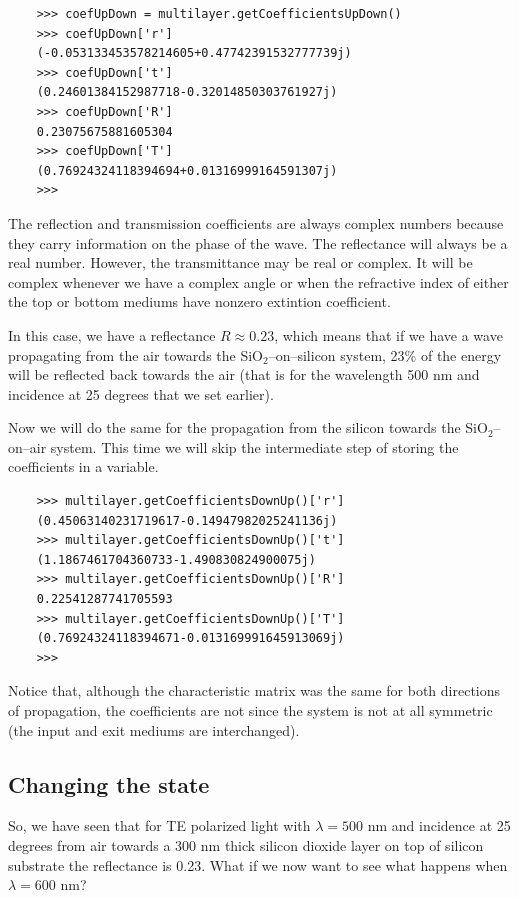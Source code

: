\documentclass[a4paper,11pt,aps,final]{revtex4}
\begin{document}
\begin{verbatim}
    >>> coefUpDown = multilayer.getCoefficientsUpDown()
    >>> coefUpDown['r']
    (-0.053133453578214605+0.47742391532777739j)
    >>> coefUpDown['t']
    (0.24601384152987718-0.32014850303761927j)
    >>> coefUpDown['R']
    0.23075675881605304
    >>> coefUpDown['T']
    (0.76924324118394694+0.01316999164591307j)
    >>>
\end{verbatim}

The reflection and transmission coefficients are always complex numbers because they carry information on the phase of the wave. The reflectance will always be a real number. However, the transmittance may be real or complex. It will be complex whenever we have a complex angle or when the refractive index of either the top or bottom mediums have nonzero extintion coefficient.

In this case, we have a reflectance $R \approx 0.23$, which means that if we have a wave propagating from the air towards the SiO$_2$--on--silicon system, 23\% of the energy will be reflected back towards the air (that is for the wavelength 500 nm and incidence at 25 degrees that we set earlier).

Now we will do the same for the propagation from the silicon towards the SiO$_2$--on--air system. This time we will skip the intermediate step of storing the coefficients in a variable.

\begin{verbatim}
    >>> multilayer.getCoefficientsDownUp()['r']
    (0.45063140231719617-0.14947982025241136j)
    >>> multilayer.getCoefficientsDownUp()['t']
    (1.1867461704360733-1.490830824900075j)
    >>> multilayer.getCoefficientsDownUp()['R']
    0.22541287741705593
    >>> multilayer.getCoefficientsDownUp()['T']
    (0.76924324118394671-0.013169991645913069j)
    >>>
\end{verbatim}

Notice that, although the characteristic matrix was the same for both directions of propagation, the coefficients are not since the system is not at all symmetric (the input and exit mediums are interchanged).

\subsection{Changing the state}

So, we have seen that for TE polarized light with $\lambda = 500$ nm and incidence at 25 degrees from air towards a 300 nm thick silicon dioxide layer on top of silicon substrate the reflectance is 0.23. What if we now want to see what happens when $\lambda = 600$ nm?
\end{document}
